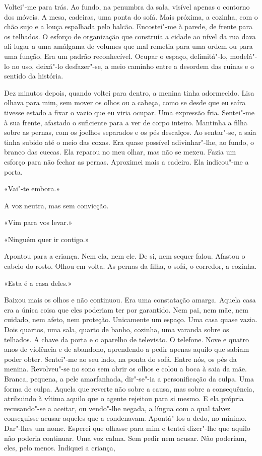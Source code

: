 Voltei"-me para trás. Ao fundo, na penumbra da sala, visível apenas o
contorno dos móveis. A mesa, cadeiras, uma ponta do sofá. Mais próxima,
a cozinha, com o chão sujo e a louça espalhada pelo balcão. Encostei"-me
à parede, de frente para os telhados. O esforço de organização que
construía a cidade ao nível da rua dava ali lugar a uma amálgama de
volumes que mal remetia para uma ordem ou para uma função. Era um padrão
reconhecível. Ocupar o espaço, delimitá"-lo, modelá"-lo no uso,
deixá"-lo desfazer"-se, a meio caminho entre a desordem das ruínas e o
sentido da história.

Dez minutos depois, quando voltei para dentro, a menina tinha
adormecido. Lisa olhava para mim, sem mover os olhos ou a cabeça, como
se desde que eu saíra tivesse estado a fixar o vazio que eu viria
ocupar. Uma expressão fria. Sentei"-me à sua frente, afastado o
suficiente para a ver de corpo inteiro. Mantinha a filha sobre as
pernas, com os joelhos separados e os pés descalços. Ao sentar"-se, a
saia tinha subido até o meio das coxas. Era quase possível
adivinhar"-lhe, ao fundo, o branco das cuecas. Ela reparou no meu olhar,
mas não se mexeu. Fazia um esforço para não fechar as pernas. Aproximei
mais a cadeira. Ela indicou"-me a porta.

«Vai"-te embora.»

A voz neutra, mas sem convicção.

«Vim para vos levar.»

«Ninguém quer ir contigo.»

Apontou para a criança. Nem ela, nem ele. De si, nem sequer falou.
Afastou o cabelo do rosto. Olhou em volta. As pernas da filha, o sofá, o
corredor, a cozinha.

«Esta é a casa deles.»

Baixou mais os olhos e não continuou. Era uma constatação amarga. Aquela
casa era a única coisa que eles poderiam ter por garantido. Nem pai, nem
mãe, nem cuidado, nem afeto, nem proteção. Unicamente um espaço. Uma
casa quase vazia. Dois quartos, uma sala, quarto de banho, cozinha, uma
varanda sobre os telhados. A chave da porta e o aparelho de televisão. O
telefone. Nove e quatro anos de violência e de abandono, aprendendo a
pedir apenas aquilo que sabiam poder obter. Sentei"-me ao seu lado, na
ponta do sofá. Entre nós, os pés da menina. Revolveu"-se no sono sem
abrir os olhos e colou a boca à saia da mãe. Branca, pequena, a pele
amarfanhada, dir"-se"-ia a personificação da culpa. Uma forma de culpa.
Aquela que reverte não sobre a causa, mas sobre a consequência,
atribuindo à vítima aquilo que o agente rejeitou para si mesmo. E ela
própria recusando"-se a aceitar, ou vendo"-lhe negada, a língua com a
qual talvez conseguisse acusar aqueles que a condenavam. Apontá"-los a
dedo, no mínimo. Dar"-lhes um nome. Esperei que olhasse para mim e
tentei dizer"-lhe que aquilo não poderia continuar. Uma voz calma. Sem
pedir nem acusar. Não poderiam, eles, pelo menos. Indiquei a criança,

